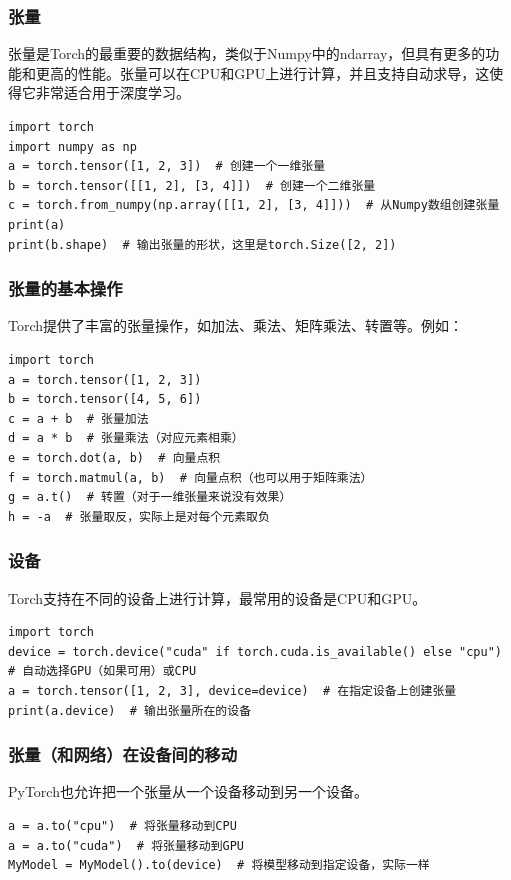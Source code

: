 \documentclass{ctexbeamer}
\begin{document}
\begin{frame}[fragile]
    \frametitle{张量}

    张量是Torch的最重要的数据结构，类似于Numpy中的ndarray，但具有更多的功能和更高的性能。张量可以在CPU和GPU上进行计算，并且支持自动求导，这使得它非常适合用于深度学习。

    \begin{verbatim}
import torch
import numpy as np
a = torch.tensor([1, 2, 3])  # 创建一个一维张量
b = torch.tensor([[1, 2], [3, 4]])  # 创建一个二维张量
c = torch.from_numpy(np.array([[1, 2], [3, 4]]))  # 从Numpy数组创建张量
print(a)
print(b.shape)  # 输出张量的形状，这里是torch.Size([2, 2])
    \end{verbatim}

\end{frame}

\begin{frame}[fragile]
    \frametitle{张量的基本操作}

    Torch提供了丰富的张量操作，如加法、乘法、矩阵乘法、转置等。例如：
    \begin{verbatim}
import torch
a = torch.tensor([1, 2, 3])
b = torch.tensor([4, 5, 6])
c = a + b  # 张量加法
d = a * b  # 张量乘法（对应元素相乘）
e = torch.dot(a, b)  # 向量点积
f = torch.matmul(a, b)  # 向量点积（也可以用于矩阵乘法）
g = a.t()  # 转置（对于一维张量来说没有效果）
h = -a  # 张量取反，实际上是对每个元素取负
    \end{verbatim}

\end{frame}

\begin{frame}[fragile]
    \frametitle{设备}

    Torch支持在不同的设备上进行计算，最常用的设备是CPU和GPU。
    \begin{verbatim}
import torch
device = torch.device("cuda" if torch.cuda.is_available() else "cpu")  # 自动选择GPU（如果可用）或CPU
a = torch.tensor([1, 2, 3], device=device)  # 在指定设备上创建张量
print(a.device)  # 输出张量所在的设备
    \end{verbatim}

\end{frame}

\begin{frame}[fragile]
    \frametitle{张量（和网络）在设备间的移动}

    PyTorch也允许把一个张量从一个设备移动到另一个设备。
    \begin{verbatim}
a = a.to("cpu")  # 将张量移动到CPU
a = a.to("cuda")  # 将张量移动到GPU
MyModel = MyModel().to(device)  # 将模型移动到指定设备，实际一样
    \end{verbatim}

\end{frame}
\end{document}
